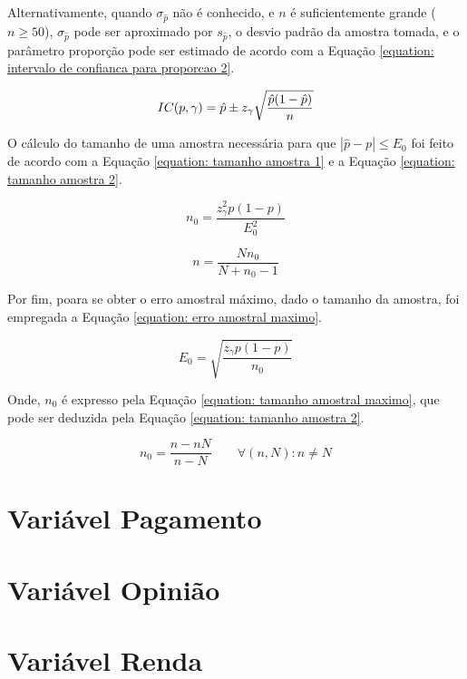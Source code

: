 \documentclass[10pt,a4paper,oneside]{article}
\begin{document}
	Alternativamente, quando $\sigma_{\hat{p}}$ não é conhecido, e $n$ é
	suficientemente grande ($n \geq 50$), $\sigma_{\hat{p}}$ pode
	ser aproximado por $s_{\hat{p}}$, o desvio padrão da amostra tomada, e o
	parâmetro proporção pode ser estimado de acordo com a Equação
	\ref{equation: intervalo de confianca para proporcao 2}.

		\begin{equation}
			IC(p, \gamma) = \hat{p} \pm z_\gamma \sqrt{\frac{\hat{p}(1-\hat{p})}{n}} \\
			\label{equation: intervalo de confianca para proporcao 2}
		\end{equation}
	
	O cálculo do tamanho de uma amostra necessária para que $|\hat{p} - p|
	\leq E_0$ foi feito de acordo com a Equação \ref{equation: tamanho amostra
	1} e a Equação \ref{equation: tamanho amostra 2}.

	\begin{equation}
		n_0 = \frac{z_\gamma^2 p(1-p)}{E_0^2}
		\label{equation: tamanho amostra 1}
	\end{equation}

	\begin{equation}
		n = \frac{N n_0}{N + n_0 - 1}
		\label{equation: tamanho amostra 2}
	\end{equation}

	Por fim, poara se obter o erro amostral máximo, dado o tamanho da
	amostra, foi empregada a Equação \ref{equation: erro amostral maximo}.
	
	\begin{equation}
		E_0 = \sqrt{\frac{z_\gamma p(1 - p) }{n_0}}
		\label{equation: erro amostral maximo}
	\end{equation}
	
	Onde, $n_0$ é expresso pela Equação	\ref{equation: tamanho amostral
	maximo}, que pode ser deduzida pela Equação \ref{equation: tamanho
	amostra 2}.

	\begin{equation}
		n_0 = \frac{n-n N}{n-N} \qquad \forall (n, N) : n \neq N
	\label{equation: tamanho amostral maximo}
	\end{equation}

\section{Variável Pagamento}
\label{questao:4}


\section{Variável Opinião}
\label{questao:5}


\section{Variável Renda}
\label{questao:6}

\end{document}
